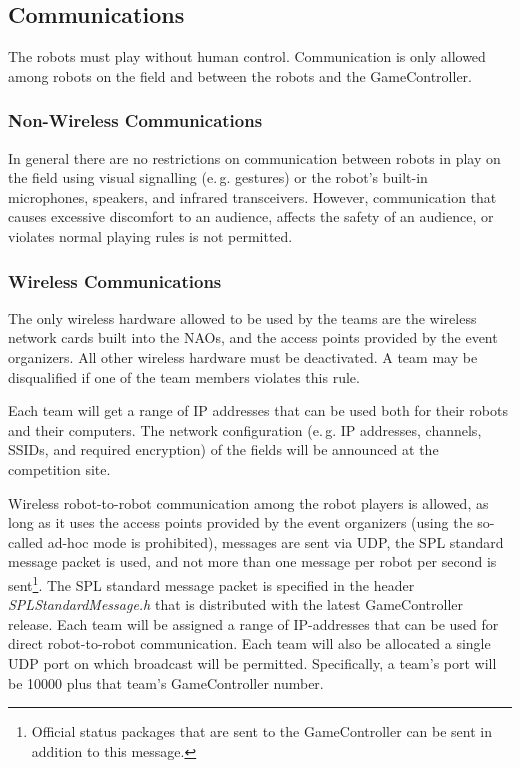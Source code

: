 \documentclass[12pt]{article}
\newcommand{\eg}{\mbox{e.\,g.}\xspace}
\begin{document}
\subsection{Communications}

The robots must play without human control. Communication is only allowed among robots on the field and between the robots and the GameController.

\subsubsection{Non-Wireless Communications}
\label{sec:acoustic}
In general there are no restrictions on communication between robots in play on the field using visual signalling (\eg gestures) or the robot's built-in microphones, speakers, and infrared transceivers. However, communication that causes excessive discomfort to an audience, affects the safety of an audience, or violates normal playing rules is not permitted.

\subsubsection{Wireless Communications}
\label{sec:wireless}
The only wireless hardware allowed to be used by the teams are the wireless network cards built into the NAOs, and the access points provided by the event organizers. All other wireless hardware must be deactivated. A team may be disqualified if one of the team members violates this rule.

Each team will get a range of IP addresses that can be used both for their robots and their computers. The network configuration (\eg IP addresses, channels, SSIDs, and required encryption) of the fields will be announced at the competition site.

Wireless robot-to-robot communication among the robot players is allowed, as long as it uses the access points provided by the event organizers (using the so-called ad-hoc mode is prohibited), messages are sent via UDP, the SPL standard message packet is used, and not more than one message per robot per second is sent\footnote{Official status packages that are sent to the GameController can be sent in addition to this message.}. The SPL standard message packet is specified in the header \emph{SPLStandardMessage.h} that is distributed with the latest GameController release. Each team will be assigned a range of IP-addresses that can be used for direct robot-to-robot communication. Each team will also be allocated a single UDP port on which broadcast will be permitted.  Specifically, a team's port will be 10000 plus that team's GameController number.
\end{document}
